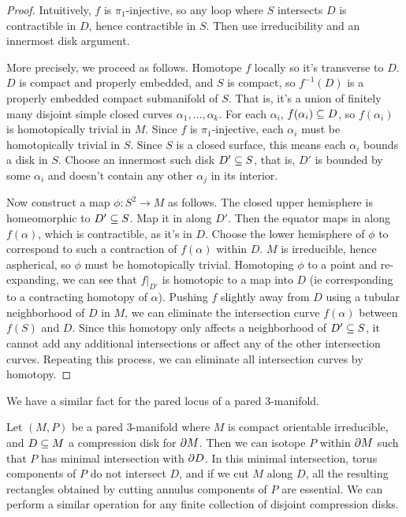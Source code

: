\begin{proof}

Intuitively, $f$ is $\pi_1$-injective, so any loop where $S$ intersects $D$ is
contractible in $D$, hence contractible in $S$. Then use irreducibility and an
innermost disk argument.

More precisely, we proceed as follows. Homotope $f$ locally so it's transverse
to $D$. $D$ is compact and properly embedded, and $S$ is compact, so
$f^{-1}(D)$ is a properly embedded compact submanifold of $S$. That is, it's
a union of finitely many disjoint simple closed curves
$\alpha_1,\dots,\alpha_k$.  For each $\alpha_i$, $f(\alpha_i) \subseteq D$, so
$f(\alpha_i)$ is homotopically trivial in $M$.  Since $f$ is $\pi_1$-injective,
each $\alpha_i$ must be homotopically trivial in $S$.  Since $S$ is a closed
surface, this means each $\alpha_i$ bounds a disk in $S$.  Choose an innermost
such disk $D' \subseteq S$, that is, $D'$ is bounded by some $\alpha_i$ and doesn't
contain any other $\alpha_j$ in its interior.

Now construct a map $\phi \colon S^2 \to M$ as follows. The closed upper
hemisphere is homeomorphic to $D' \subseteq S$. Map it in along $D'$. Then the
equator maps in along $f(\alpha)$, which is contractible, as it's in $D$.
Choose the lower hemisphere of $\phi$ to correspond to such a contraction of
$f(\alpha)$ within $D$.  $M$ is irreducible, hence aspherical, so $\phi$ must
be homotopically trivial.  Homotoping $\phi$ to a point and re-expanding, we
can see that $f|_{D'}$ is homotopic to a map into $D$ (ie corresponding to
a contracting homotopy of $\alpha$). Pushing $f$ slightly away from $D$ using
a tubular neighborhood of $D$ in $M$, we can eliminate the intersection curve
$f(\alpha)$ between $f(S)$ and $D$.  Since this homotopy only affects
a neighborhood of $D' \subseteq S$, it cannot add any additional intersections or
affect any of the other intersection curves.  Repeating this process, we can
eliminate all intersection curves by homotopy.

\end{proof}

We have a similar fact for the pared locus of a pared 3-manifold.

\begin{prop}

Let $(M,P)$ be a pared 3-manifold where $M$ is compact orientable irreducible,
and $D \subseteq M$ a compression disk for $\partial M$. Then we can isotope $P$ within
$\partial M$ such that $P$ has minimal intersection with $\partial D$. In this minimal
intersection, torus components of $P$ do not intersect $D$, and if we cut $M$
along $D$, all the resulting rectangles obtained by cutting annulus components
of $P$ are essential.  We can perform a similar operation for any finite
collection of disjoint compression disks.

\end{prop}

